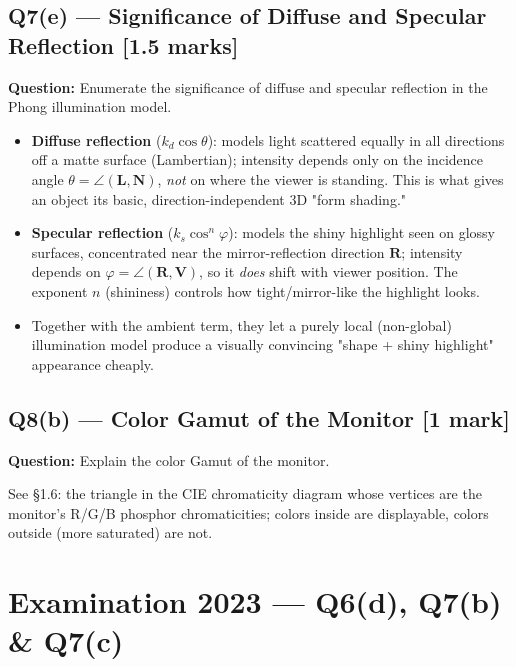 \documentclass[12pt, a4paper]{article}
\newenvironment{solutionbox}{\begin{mdframed}[style=solutionframe]}{\end{mdframed}}
\newenvironment{answerbox}{\begin{mdframed}[style=answerframe]}{\end{mdframed}}
\begin{document}
\subsection*{Q7(e) --- Significance of Diffuse and Specular Reflection [1.5 marks]}
\begin{solutionbox}
\textbf{Question:} Enumerate the significance of diffuse and specular reflection in the Phong illumination model.
\end{solutionbox}
\begin{answerbox}
\begin{itemize}[noitemsep]
  \item \textbf{Diffuse reflection} ($k_d\cos\theta$): models light scattered equally in all directions off a matte surface (Lambertian); intensity depends only on the incidence angle $\theta=\angle(\mathbf{L},\mathbf{N})$, \emph{not} on where the viewer is standing. This is what gives an object its basic, direction-independent 3D "form shading."
  \item \textbf{Specular reflection} ($k_s\cos^n\varphi$): models the shiny highlight seen on glossy surfaces, concentrated near the mirror-reflection direction $\mathbf{R}$; intensity depends on $\varphi=\angle(\mathbf{R},\mathbf{V})$, so it \emph{does} shift with viewer position. The exponent $n$ (shininess) controls how tight/mirror-like the highlight looks.
  \item Together with the ambient term, they let a purely local (non-global) illumination model produce a visually convincing "shape + shiny highlight" appearance cheaply.
\end{itemize}
\end{answerbox}

\subsection*{Q8(b) --- Color Gamut of the Monitor [1 mark]}
\begin{solutionbox}
\textbf{Question:} Explain the color Gamut of the monitor.
\end{solutionbox}
\begin{answerbox}
See \S1.6: the triangle in the CIE chromaticity diagram whose vertices are the monitor's R/G/B phosphor chromaticities; colors inside are displayable, colors outside (more saturated) are not.
\end{answerbox}

\section{Examination 2023 --- Q6(d), Q7(b) \& Q7(c)}
\end{document}
